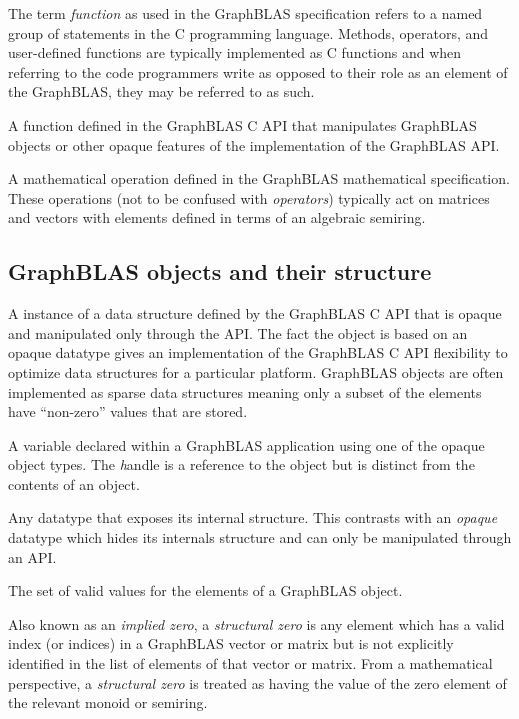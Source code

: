  The term \emph{function} as used in the GraphBLAS specification
refers to a named group of statements in the C programming language.  Methods, operators,
and user-defined functions are typically implemented as C functions and when referring to 
the code programmers write as opposed to their role as an element of the GraphBLAS, they may
be referred to as such.

 A function defined in the GraphBLAS C API that manipulates
GraphBLAS objects or other opaque features of the implementation of the GraphBLAS API.

 A mathematical operation defined in the
GraphBLAS mathematical specification. These operations (not to be confused with \emph{operators}) typically act
on matrices and vectors with elements defined in terms of an algebraic semiring. 
\glossEnd

\subsection{GraphBLAS objects and their structure}

\glossBegin
{}  A instance of a data structure defined by the GraphBLAS C
API that is opaque and manipulated only through the API.  The fact the object
is based on an opaque datatype gives an implementation of the GraphBLAS C API
flexibility to optimize data structures for a particular platform.  GraphBLAS objects
are often implemented as sparse data structures meaning only a subset of the
elements have ``non-zero'' values that are stored.

 A variable declared within a GraphBLAS application using
one of the opaque object types.  The {\emph handle} is a reference to the object
but is distinct from the contents of an object.   

 Any datatype that exposes its internal structure.   This contrasts
with an \emph{opaque} datatype which hides its internals structure and can only
be manipulated through an API.

 The set of valid values for the elements of a GraphBLAS object.

 Also known as an \emph{implied zero}, a \emph{structural zero} is 
any element which has a valid index (or indices) in a GraphBLAS vector or matrix 
but is not explicitly identified in the list of elements of that vector or matrix. From 
a mathematical perspective, a \emph{structural zero} is treated as having the 
value of the zero element of the relevant monoid or semiring.

